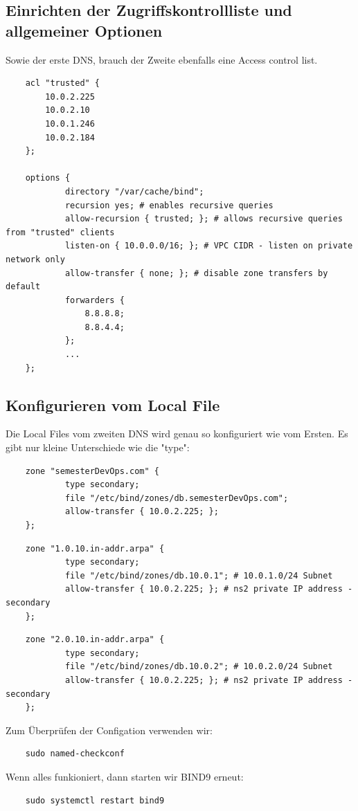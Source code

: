 \documentclass[a4paper,12pt]{article}
\begin{document}
\subsection{Einrichten der Zugriffskontrollliste und allgemeiner Optionen}  

Sowie der erste DNS, brauch der Zweite ebenfalls eine Access control list.
\begin{verbatim}
	acl "trusted" {
		10.0.2.225
		10.0.2.10
		10.0.1.246
		10.0.2.184
	};

	options {
			directory "/var/cache/bind";
			recursion yes; # enables recursive queries
			allow-recursion { trusted; }; # allows recursive queries from "trusted" clients
			listen-on { 10.0.0.0/16; }; # VPC CIDR - listen on private network only
			allow-transfer { none; }; # disable zone transfers by default
			forwarders {
				8.8.8.8;
				8.8.4.4;
			};
			...
	};
\end{verbatim}


\subsection{Konfigurieren vom Local File}
Die Local Files vom zweiten DNS wird genau so konfiguriert wie vom Ersten. 
Es gibt nur kleine Unterschiede wie die "type": 


\begin{verbatim}
	zone "semesterDevOps.com" {
			type secondary;
			file "/etc/bind/zones/db.semesterDevOps.com"; 
			allow-transfer { 10.0.2.225; };
	};
\end{verbatim}


\begin{verbatim}
	zone "1.0.10.in-addr.arpa" {
			type secondary;
			file "/etc/bind/zones/db.10.0.1"; # 10.0.1.0/24 Subnet
			allow-transfer { 10.0.2.225; }; # ns2 private IP address - secondary
	};
\end{verbatim}


\begin{verbatim}
	zone "2.0.10.in-addr.arpa" {
			type secondary;
			file "/etc/bind/zones/db.10.0.2"; # 10.0.2.0/24 Subnet
			allow-transfer { 10.0.2.225; }; # ns2 private IP address - secondary
	};
\end{verbatim}

Zum Überprüfen der Configation verwenden wir:
\begin{verbatim}
	sudo named-checkconf
\end{verbatim}

Wenn alles funkioniert, dann starten wir BIND9 erneut:
\begin{verbatim}
	sudo systemctl restart bind9
\end{verbatim}
\end{document}
